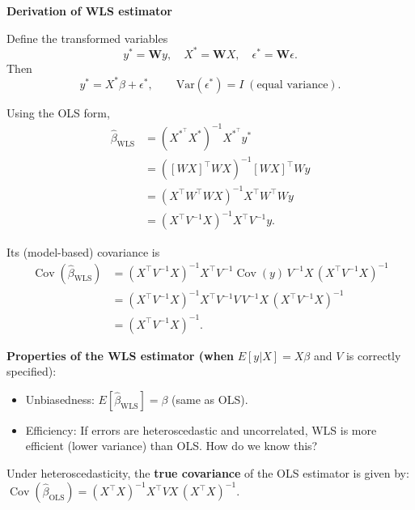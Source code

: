\documentclass[
  letterpaper,
  DIV=11,
  numbers=noendperiod]{scrreprt}
\providecommand{\tightlist}{%
  \setlength{\itemsep}{0pt}\setlength{\parskip}{0pt}}\usepackage{longtable,booktabs,array}
\begin{document}
\begin{tcolorbox}[enhanced jigsaw, rightrule=.15mm, breakable, left=2mm, colframe=quarto-callout-tip-color-frame, opacityback=0, leftrule=.75mm, toprule=.15mm, colback=white, arc=.35mm, bottomrule=.15mm]

\textbf{Derivation of WLS estimator}\vspace{2mm}

Define the transformed variables \[
y^*=\mathbf{W}y,\quad X^*=\mathbf{W}X,\quad \epsilon^*=\mathbf{W}\epsilon.
\] Then \[
y^*=X^*\beta+\epsilon^*,\qquad \mathrm{Var}(\epsilon^*)=I \; (\text{equal variance}).
\]

Using the OLS form, \[
\begin{aligned}
\hat\beta_{\text{WLS}}
&=(X^{*^\top}X^*)^{-1}X^{*^\top}y^* \\
&=([WX]^\top WX)^{-1}[WX]^\top Wy \\
&=(X^\top W^\top WX)^{-1}X^\top W^\top Wy \\
&=(X^\top V^{-1}X)^{-1}X^\top V^{-1}y.
\end{aligned}
\]

Its (model-based) covariance is \[
\begin{aligned}
\operatorname{Cov}(\hat\beta_{\text{WLS}})
&=(X^\top V^{-1}X)^{-1}X^\top V^{-1}\operatorname{Cov}(y)\,V^{-1}X\,(X^\top V^{-1}X)^{-1} \\
&=(X^\top V^{-1}X)^{-1}X^\top V^{-1} V\, V^{-1}X\,(X^\top V^{-1}X)^{-1}\\
&=(X^\top V^{-1}X)^{-1}.
\end{aligned}
\]

\end{tcolorbox}

\textbf{Properties of the WLS estimator (when} \(E[y|X]=X\beta\) and
\(V\) is correctly specified):

\begin{itemize}
\tightlist
\item
  Unbiasedness: \(E[\hat\beta_{\text{WLS}}]=\beta\) (same as OLS).\\
\item
  Efficiency: If errors are heteroscedastic and uncorrelated, WLS is
  more efficient (lower variance) than OLS. How do we know this?
\end{itemize}

Under heteroscedasticity, the \textbf{true covariance} of the OLS
estimator is given by:
\(\operatorname{Cov}(\hat\beta_{\text{OLS}})  =(X^\top X)^{-1}X^\top V X\,(X^\top X)^{-1}.\)
\end{document}
